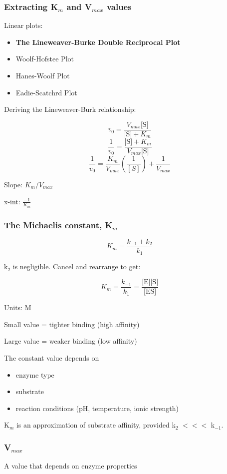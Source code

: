 \documentclass[letterpaper, 12pt]{article}
\begin{document}
\subsubsection*{Extracting K$_m$ and V$_{max}$ values}
Linear plots:

\begin{itemize}
\item \textbf{The Lineweaver-Burke Double Reciprocal Plot}
\item Woolf-Hofstee Plot
\item Hanes-Woolf Plot
\item Eadie-Scatchrd Plot
\end{itemize}

Deriving the Lineweaver-Burk relationship:

$$v_0 = \frac{V_{max}\text{[S]}}{\text{[S]} + K_m}$$
$$ \frac{1}{v_0} = \frac{\text{[S]} + K_m}{V_{max}\text{[S]}} $$
$$ \frac{1}{v_0} = \frac{K_m}{V_{max}} \left(\frac{1}{[S]}\right) + \frac{1}{V_{max}}$$

Slope: $K_m$/$V_{max}$

x-int: $\displaystyle \frac{-1}{K_m}$

\subsubsection*{The Michaelis constant, K$_m$}

$$ K_m = \frac{k_{-1} + k_2}{k_1} $$

k$_2$ is negligible. Cancel and rearrange to get:

$$ K_m = \frac{k_{-1}}{k_1} = \frac{\text{[E]}\text{[S]}}{\text{[ES]}} $$

Units: M

Small value = tighter binding (high affinity)

Large value = weaker binding (low affinity) 

The constant value depends on 

\begin{itemize}
\item enzyme type
\item substrate
\item reaction conditions (pH, temperature, ionic strength)
\end{itemize}

K$_m$ is an approximation of substrate affinity, provided k$_2$ $<<<$ k$_{-1}$.

\subsubsection*{V$_{max}$}
A value that depends on enzyme properties
\end{document}
